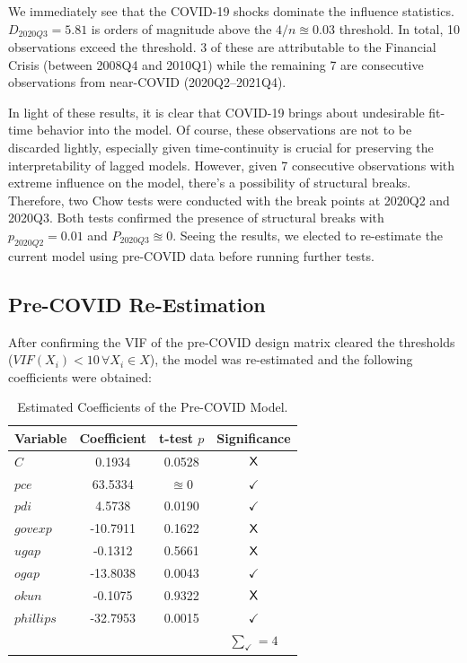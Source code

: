 \noindent We immediately see that the COVID-19 shocks dominate the influence statistics.
$D_{2020Q3} = 5.81$ is orders of magnitude above the $4/n \approxeq 0.03$ threshold.
In total, 10 observations exceed the threshold. 
3 of these are attributable to the Financial Crisis (between 2008Q4 and 2010Q1) while the remaining 7 are consecutive observations from near-COVID (2020Q2--2021Q4).

\vspace{\baselineskip}

In light of these results, it is clear that COVID-19 brings about undesirable fit-time behavior into the model.
Of course, these observations are not to be discarded lightly, especially given time-continuity is crucial for preserving the interpretability of lagged models.
However, given 7 consecutive observations with extreme influence on the model, there's a possibility of structural breaks.
Therefore, two Chow tests were conducted with the break points at 2020Q2 and 2020Q3.
Both tests confirmed the presence of structural breaks with $p_{2020Q2} = 0.01$ and $P_{2020Q3}\approxeq 0$.
Seeing the results, we elected to re-estimate the current model using pre-COVID data before running further tests.

\subsection{Pre-COVID Re-Estimation}\label{subsec:pre_covid_reestimation}
After confirming the VIF of the pre-COVID design matrix cleared the thresholds ($VIF(X_i) < 10 \, \forall X_i \in X$), the model was re-estimated and the following coefficients were obtained:
\begin{table}[H]
    \centering
    \begin{tabular}{lccc}
        \toprule
        \textbf{Variable} & \textbf{Coefficient} & \textbf{t-test $p$} & \textbf{Significance} \\
        \midrule
        $C$ & 0.1934 & 0.0528 & $\text{\sffamily{X}}$ \\ 
        $pce$ & 63.5334 & $\approxeq 0$ & $\checkmark$ \\
        $pdi$ & 4.5738 & 0.0190 & $\checkmark$ \\
        $govexp$ & -10.7911 & 0.1622 & $\text{\sffamily{X}}$ \\
        $ugap$ & -0.1312 & 0.5661 & $\text{\sffamily{X}}$ \\
        $ogap$ & -13.8038 & 0.0043 & $\checkmark$ \\
        $okun$ &  -0.1075 & 0.9322 & $\text{\sffamily{X}}$ \\
        $phillips$ & -32.7953 & 0.0015 & $\checkmark$ \\
        \midrule
        & & & $\sum_\checkmark = 4$ \\
        \bottomrule
    \end{tabular}
    \caption{Estimated Coefficients of the Pre-COVID Model.}
    \label{tab:precovid_estimated_coefficients}
\end{table}

